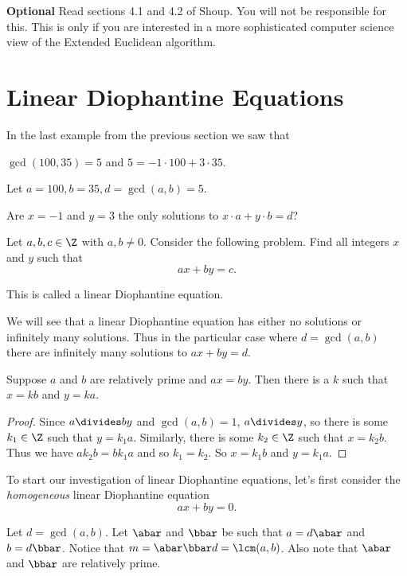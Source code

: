 \documentclass[oneside,12pt]{amsart}
\begin{document}
\bigskip

\textbf{Optional} Read sections 4.1 and 4.2 of Shoup. You will not be responsible for this. This is only if you are interested
in a more sophisticated computer science view of the Extended Euclidean algorithm.

\newpage

\section{Linear Diophantine Equations}

In the last example from the previous section we saw that 

$\gcd(100,35) = 5$ and $5 = -1 \cdot 100 + 3 \cdot 35$.

\begin{question}
Let $a=100, b=35, d=\gcd(a,b)=5$.


Are $x=-1$ and $y=3$ the only solutions to $x\cdot a + y\cdot b = d$?

\end{question}

Let $a,b,c\in\Z$ with $a,b\not=0$. Consider the following problem. Find all integers $x$ and $y$ such that
$$ax+by=c.$$

This is called a linear Diophantine equation.

We will see that a linear Diophantine equation has either no solutions or infinitely many solutions. Thus in
the particular case where $d=\gcd(a,b)$ there are infinitely many solutions to $ax+by=d$.


\begin{lemma}
Suppose $a$ and $b$ are relatively prime and $ax=by$.
Then there is a $k$ such that $x=k b$ and $y=ka$.
\end{lemma}
\begin{proof}
Since $a \divides by$ and $\gcd(a,b) = 1$, $a\divides y$, so there is some $k_1\in\Z$ such that
$y=k_1 a$. Similarly, there is some $k_2\in\Z$ such that $x=k_2 b$. Thus we have $ak_2 b = bk_1 a$
and so $k_1=k_2$. So $x = k_1 b$ and $y=k_1 a$.
\end{proof}

To start our investigation of linear Diophantine equations, let's first
consider the \emph{homogeneous} linear Diophantine equation
$$ax+by=0.$$


Let $d=\gcd(a,b)$.  Let $\abar$ and $\bbar$ be such that $a=d\abar$ and $b=d\bbar$.
Notice that $m=\abar \bbar d = \lcm(a,b)$.  Also note that $\abar$ and $\bbar$ are relatively prime. 
\end{document}

